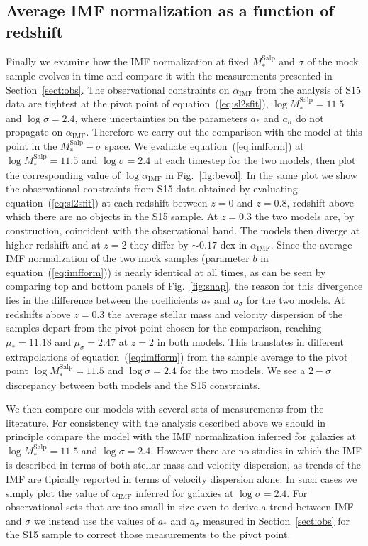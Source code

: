 \documentclass[usenatbib]{mnras}
\def\msalp{M_*^{\mathrm{Salp}}}
\def\aimf{\alpha_{\mathrm{IMF}}}
\def\Sref#1{Section~\ref{#1}\xspace}
\def\Fref#1{Fig.~\ref{#1}\xspace}
\def\Eref#1{equation~(\ref{#1})\xspace}
\begin{document}
\subsection{Average IMF normalization as a function of redshift}


Finally we examine how the IMF normalization at fixed $\msalp$ and
$\sigma$ of the mock sample evolves in time and compare it with the
measurements presented in \Sref{sect:obs}.  The observational
constraints on $\aimf$ from the analysis of S15 data are tightest at
the pivot point of \Eref{eq:sl2sfit}, $\log{\msalp} = 11.5$ and
$\log{\sigma} = 2.4$, where uncertainties on the parameters $a_*$ and $a_\sigma$ do not propagate on $\aimf$. Therefore we carry out the comparison with the
model at this point in the $\msalp-\sigma$ space.  We evaluate
\Eref{eq:imfform} at $\log{\msalp} = 11.5$ and $\log{\sigma} = 2.4$ at
each timestep for the two models, then plot the corresponding value of
$\log{\aimf}$ in \Fref{fig:bevol}.  In the same plot we show the
observational constraints from S15 data obtained by evaluating
\Eref{eq:sl2sfit} at each redshift between $z=0$ and $z=0.8$, redshift
above which there are no objects in the S15 sample.  At $z=0.3$ the
two models are, by construction, coincident with the observational
band. The models then diverge at higher redshift and at $z=2$ they
differ by $\sim 0.17$ dex in $\aimf$.  
%
Since the average IMF
normalization of the two mock samples (parameter $b$ in
\Eref{eq:imfform}) is nearly identical at all times, as can be seen by
comparing top and bottom panels of \Fref{fig:snap}, the reason for this divergence lies in the difference
between the coefficients $a_*$ and $a_\sigma$ for the two models.  At
redshifts above $z=0.3$ the average stellar mass and velocity
dispersion of the samples depart from the pivot point chosen for the
comparison, reaching $\mu_*=11.18$ and $\mu_\sigma=2.47$ at $z=2$ in both models.  This translates in different
extrapolations of \Eref{eq:imfform} from the sample average to the
pivot point $\log{\msalp}=11.5$ and $\log{\sigma}=2.4$ for the two
models.  We see a $2-\sigma$ discrepancy between both models and the
S15 constraints. 

We then compare our models with several sets of measurements from the
literature.  For consistency with the analysis described above we
should in principle compare the model with the IMF normalization
inferred for galaxies at $\log{\msalp}=11.5$ and $\log{\sigma}=2.4$.
However there are no studies in which the IMF is described in terms of
both stellar mass and velocity dispersion, as trends of the IMF are
tipically reported in terms of velocity dispersion alone.  In such
cases we simply plot the value of $\aimf$ inferred for galaxies at
$\log{\sigma}=2.4$.  For observational sets that are too small in size
even to derive a trend between IMF and $\sigma$ we instead use the
values of $a_*$ and $a_\sigma$ measured in \Sref{sect:obs} for the S15
sample to correct those measurements to the pivot point.
\end{document}
